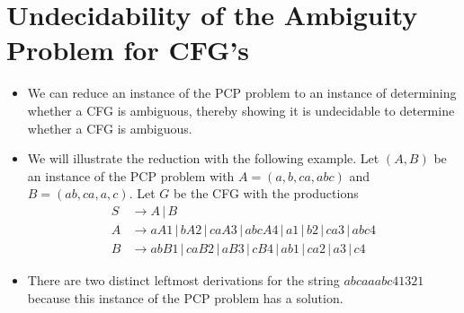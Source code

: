 \documentclass[]{article}
\begin{document}
\section{Undecidability of the Ambiguity Problem for CFG's}
\begin{itemize}
\item We can reduce an instance of the PCP problem to an instance of determining
whether a CFG is ambiguous, thereby showing it is undecidable to determine
whether a CFG is ambiguous.
\item We will illustrate the reduction with the following example. Let $(A, B)$
be an instance of the PCP problem with $A = (a, b, ca, abc)$ and $B = (ab, ca,
a, c)$. Let $G$ be the CFG with the productions
\begin{align*}
S &\rightarrow A\,|\,B \\
A &\rightarrow aA1\,|\,bA2\,|\,caA3\,|\,abcA4\,|\,a1\,|\,b2\,|\,ca3\,|\,abc4 \\
B &\rightarrow abB1\,|\,caB2\,|\,aB3\,|\,cB4\,|\,ab1\,|\,ca2\,|\,a3\,|\,c4
\end{align*}
\item There are two distinct leftmost derivations for the string $abcaaabc41321$
because this instance of the PCP problem has a solution.
\end{itemize}
\end{document}
